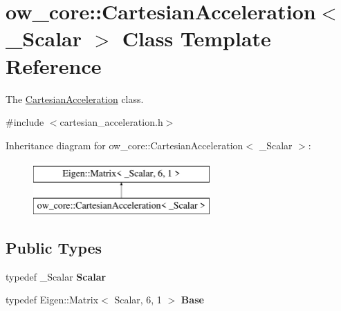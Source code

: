 \hypertarget{classow__core_1_1CartesianAcceleration}{}\section{ow\+\_\+core\+:\+:Cartesian\+Acceleration$<$ \+\_\+\+Scalar $>$ Class Template Reference}
\label{classow__core_1_1CartesianAcceleration}


The \hyperlink{classow__core_1_1CartesianAcceleration}{Cartesian\+Acceleration} class.  




{\ttfamily \#include $<$cartesian\+\_\+acceleration.\+h$>$}

Inheritance diagram for ow\+\_\+core\+:\+:Cartesian\+Acceleration$<$ \+\_\+\+Scalar $>$\+:\begin{figure}[H]
\begin{center}
\leavevmode
\includegraphics[height=2.000000cm]{df/d67/classow__core_1_1CartesianAcceleration}
\end{center}
\end{figure}
\subsection*{Public Types}
\begin{DoxyCompactItemize}
\item 
typedef \+\_\+\+Scalar {\bfseries Scalar}\hypertarget{classow__core_1_1CartesianAcceleration_aa6c9e5a1a1c66107763255ebd637926d}{}\label{classow__core_1_1CartesianAcceleration_aa6c9e5a1a1c66107763255ebd637926d}

\item 
typedef Eigen\+::\+Matrix$<$ Scalar, 6, 1 $>$ {\bfseries Base}\hypertarget{classow__core_1_1CartesianAcceleration_af0e02dd04a0364641ca0b75b9e9e74de}{}\label{classow__core_1_1CartesianAcceleration_af0e02dd04a0364641ca0b75b9e9e74de}

\end{DoxyCompactItemize}
